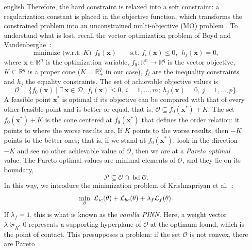 \documentclass[../0000.tex]{subfiles}
\begin{document}
\begin{hyphenrules}{english}
Therefore, the hard constraint is relaxed into a soft constraint: a regularization constant is placed in
the objective function, which transforms the constrained problem into an unconstrained multi-objective
(MO) problem \cite{krishnapriyan2021}. To understand what is lost, recall the vector optimization
problem of Boyd and Vandenberghe~\cite{boyd2004}:
\begin{equation}
  \text{minimize (w.r.t. } K)\ \ f_0(\mathbf{x})\qquad\text{s.t. } f_i(\mathbf{x})\le0,\ \ h_j(\mathbf{x})=0,
  \label{eq:vector-opt}
\end{equation}
where $\mathbf{x}\in\mathbb{R}^n$ is the optimization variable, $f_0:\mathbb{R}^n\to\mathbb{R}^q$ is the vector objective,
$K\subseteq\mathbb{R}^q$ is a proper cone ($K=\mathbb{R}^q_+$ in our case), $f_i$ are the inequality constraints and
$h_j$ the equality constraints. The set of achievable objective values is
\begin{equation}
  \mathcal{O}=\{f_0(\mathbf{x})\mid\exists\,\mathbf{x}\in\mathcal{D},\ f_i(\mathbf{x})\le0,\ i=1,\dots,m;\ h_j(\mathbf{x})=0,\ j=1,\dots,p\}.
  \label{eq:achievable-set}
\end{equation}
A feasible point $\mathbf{x}^{*}$ is optimal if its objective can be compared with that of every other feasible
point and is better or equal, that is, $\mathcal{O}\subseteq f_0(\mathbf{x}^{*})+K$. The set $f_0(\mathbf{x}^{*})+K$ is
the cone centered at $f_0(\mathbf{x}^{*})$ that defines the order relation: it points to where the worse results
are. If $K$ points to the worse results, then $-K$ points to the better ones; that is, if we stand at
$f_0(\mathbf{x}^{*})$, look in the direction $-K$ and see no other achievable value of $\mathcal{O}$, then we are at
a \emph{Pareto optimal} value. The Pareto optimal values are minimal elements of $\mathcal{O}$, and they
lie on its boundary,
\begin{equation}
  \mathcal{P}\subseteq\mathcal{O}\cap\operatorname{bd}\mathcal{O}.
  \label{eq:pareto}
\end{equation}
In this way, we introduce the minimization problem of Krishnapriyan et al.~\cite{krishnapriyan2021}:
\begin{equation}
  \min_{\theta}\ \Loss_{ic}(\theta)+\Loss_{bc}(\theta)+\lambda_f\Loss_f(\theta).
  \label{eq:soft}
\end{equation}
If $\lambda_f=1$, this is what is known as the \emph{vanilla PINN}. Here, a weight vector
$\lambda\succeq_{K^{*}}0$ represents a supporting hyperplane of $\mathcal{O}$ at the optimum found, which is
the point of contact. This presupposes a problem: if the set $\mathcal{O}$ is not convex, there are Pareto

\end{hyphenrules}
\end{document}
